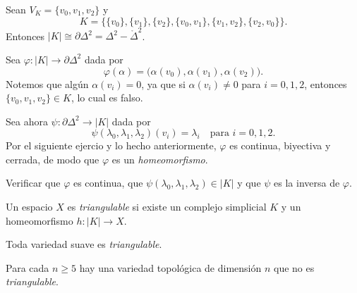\begin{lema}
Sean $V_K = \{v_0, v_1, v_2\}$ y
\[
K = \big\{ \{v_0\}, \{v_1\}, \{v_2\}, \{v_0, v_1\}, \{v_1, v_2\}, \{v_2, v_0\} \big\}.
\]
Entonces $|K| \cong \partial\Delta^2 = \Delta^2 - \mathring{\Delta}^2$.
\end{lema}

\begin{dem}
Sea $\varphi \colon |K| \to \partial\Delta^2$ dada por
\[
\varphi(\alpha) = \big(\alpha(v_0), \alpha(v_1), \alpha(v_2)\big).
\]
Notemos que algún $\alpha(v_i) = 0$, ya que si $\alpha(v_i) \neq 0$ para $i = 0, 1, 2$, entonces $\{v_0, v_1, v_2\} \in K$, lo cual es falso. 

Sea ahora $\psi \colon \partial\Delta^2 \to |K|$ dada por
\[
\psi(\lambda_0, \lambda_1, \lambda_2)(v_i) = \lambda_i \quad \text{para } i = 0, 1, 2.
\]
Por el siguiente ejercio y lo hecho anteriormente, $\varphi$ es continua, biyectiva y cerrada, de modo que $\varphi$ es un \textit{homeomorfismo}.
\end{dem}
\begin{ejercicio}
Verificar que $\varphi$ es continua, que $\psi(\lambda_0, \lambda_1, \lambda_2) \in |K|$ y que $\psi$ es la inversa de $\varphi$.
\end{ejercicio}
\begin{definicion}
Un espacio $X$ es \textit{triangulable} si existe un complejo simplicial $K$ y un homeomorfismo $h \colon |K| \to X$.
\end{definicion}

\begin{teorema}
Toda variedad suave es \textit{triangulable}.
\end{teorema}

\begin{teorema}[Manolescu, 2016]
Para cada $n \geq 5$ hay una variedad topológica de dimensión $n$ que no es \textit{triangulable}.
\end{teorema}

